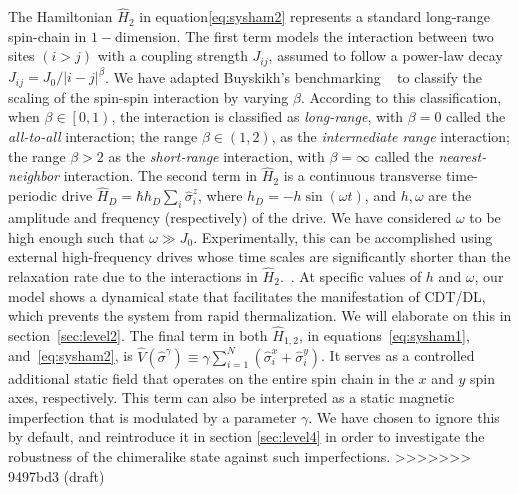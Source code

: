 \documentclass[12pt]{iopart}
\begin{document}
The Hamiltonian $\hat{H}_2$ in equation\eqref{eq:sysham2} represents a standard long-range spin-chain in $1-$dimension. The first term models the interaction between two sites $(i>j)$ with a coupling strength $J_{ij}$, assumed to follow a power-law decay $J_{ij}={J_0}/{|i-j|^\beta}$. We have adapted Buyskikh's benchmarking ~\cite{buyskikh_entanglement_2016} to classify the scaling of the spin-spin interaction by varying $\beta$. According to this classification, when $\beta\in\left[0,1\right)$, the interaction is classified as \textit{long-range}, with $\beta=0$ called the \textit{all-to-all} interaction; the range $\beta\in \left(1,2\right)$, as the \textit{ intermediate range} interaction; the range $\beta > 2$ as the \textit{ short-range} interaction, with $\beta= \infty$ called the \textit{ nearest-neighbor} interaction. The second term in $\hat{H}_2$ is a continuous transverse time-periodic drive $\displaystyle \hat{H}_D=\hbar h_D \sum_i\hat{\sigma}^z_i$, where $\displaystyle h_D = -h\sin{(\omega t)}$, and $h,\omega$ are the amplitude and frequency (respectively) of the drive. We have considered $\omega$ to be high enough such that $\omega\gg J_0$. 	Experimentally, this can be accomplished using external high-frequency drives whose time scales are significantly shorter than the relaxation rate due to the interactions in $\hat{H}_2$.~\cite{choi_observation_2017,zhang_observation_2017,Cirac_1995,Blatt_2012}. At specific values of $h$ and $\omega$, our model shows a dynamical state that facilitates the manifestation of CDT/DL, which prevents the system from rapid thermalization. We will elaborate on this in section~\ref{sec:level2}. The final term in both $\hat{H}_{1,2}$, in equations~\eqref{eq:sysham1}, and~\eqref{eq:sysham2}, is $\displaystyle \hat{V}(\hat{\sigma}^{\gamma}) \equiv\gamma  \sum_{i=1}^{N} (\hat{\sigma}^x_i + \hat{\sigma}^y_i)$. It serves as a controlled additional static field that operates on the entire spin chain in the $x$ and $y$ spin axes, respectively.  This term can also be interpreted as a static magnetic imperfection that is modulated by a parameter $\gamma$. We have chosen to ignore this by default, and reintroduce it in section \ref{sec:level4} in order to investigate the robustness of the chimeralike state against such imperfections.
>>>>>>> 9497bd3 (draft)
\end{document}
